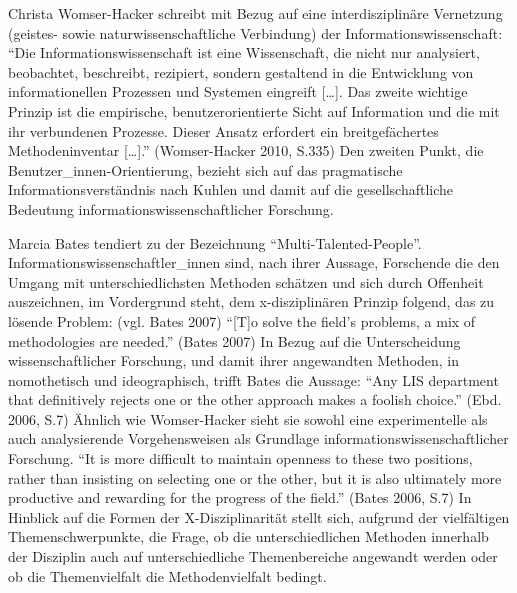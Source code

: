 \documentclass[a4paper,
fontsize=11pt,
oneside,
numbers=noperiodatend,
parskip=half-,
bibliography=totoc,
final
]{scrartcl}
\begin{document}
Christa Womser-Hacker schreibt mit Bezug auf eine interdisziplinäre
Vernetzung (geistes- sowie naturwissenschaftliche Verbindung) der
Informationswissenschaft: \enquote{Die Informationswissenschaft ist eine
Wissenschaft, die nicht nur analysiert, beobachtet, beschreibt,
rezipiert, sondern gestaltend in die Entwicklung von informationellen
Prozessen und Systemen eingreift {[}\ldots{}{]}. Das zweite wichtige
Prinzip ist die empirische, benutzerorientierte Sicht auf Information
und die mit ihr verbundenen Prozesse. Dieser Ansatz erfordert ein
breitgefächertes Methodeninventar {[}\ldots{}{]}.} (Womser-Hacker 2010,
S.335) Den zweiten Punkt, die Benutzer\_innen-Orientierung, bezieht sich
auf das pragmatische Informationsverständnis nach Kuhlen und damit auf
die gesellschaftliche Bedeutung informationswissenschaftlicher
Forschung.

Marcia Bates tendiert zu der Bezeichnung
\enquote{Multi-Talented-People}. Informationswissenschaftler\_innen
sind, nach ihrer Aussage, Forschende die den Umgang mit
unterschiedlichsten Methoden schätzen und sich durch Offenheit
auszeichnen, im Vordergrund steht, dem x-disziplinären Prinzip folgend,
das zu lösende Problem: (vgl. Bates 2007) \enquote{{[}T{]}o solve the
field's problems, a mix of methodologies are needed.} (Bates 2007) In
Bezug auf die Unterscheidung wissenschaftlicher Forschung, und damit
ihrer angewandten Methoden, in nomothetisch und ideographisch, trifft
Bates die Aussage: \enquote{Any LIS department that definitively rejects
one or the other approach makes a foolish choice.} (Ebd. 2006, S.7)
Ähnlich wie Womser-Hacker sieht sie sowohl eine experimentelle als auch
analysierende Vorgehensweisen als Grundlage
informationswissenschaftlicher Forschung. \enquote{It is more difficult
to maintain openness to these two positions, rather than insisting on
selecting one or the other, but it is also ultimately more productive
and rewarding for the progress of the field.} (Bates 2006, S.7) In
Hinblick auf die Formen der X-Disziplinarität stellt sich, aufgrund der
vielfältigen Themenschwerpunkte, die Frage, ob die unterschiedlichen
Methoden innerhalb der Disziplin auch auf unterschiedliche
Themenbereiche angewandt werden oder ob die Themenvielfalt die
Methodenvielfalt bedingt.
\end{document}
